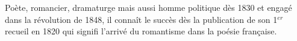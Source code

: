 \documentclass[12pt,a4paper]{article}
\begin{document}
\begin{center}
        \shadowbox{\begin{large}
                \textcolor{black}{Alphonse de Lamartine}
        \end{large}}
    \end{center}
    \vspace{0.5 cm}


Po\`ete, romancier, dramaturge mais aussi homme politique d\`es 1830 et engag\'e dans la r\'evolution de 1848, il conna\^it le succ\`es d\`es la publication de son 1$^{er}$ recueil en 1820
        qui signifi l'arriv\'e du romantisme dans la po\'esie fran\c caise.
\end{document}
